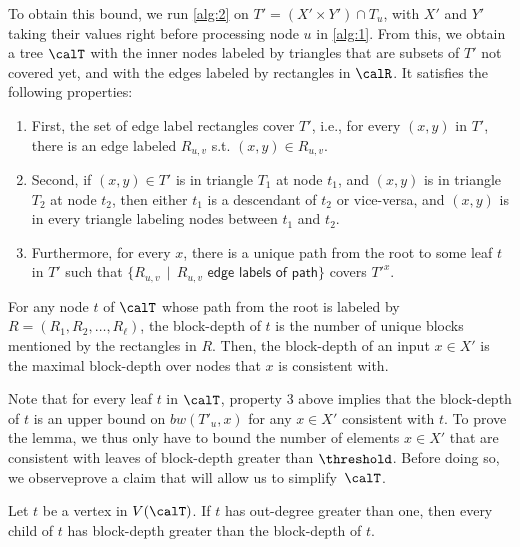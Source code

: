     To obtain this bound, we run \autoref{alg:2} on $T' = (X'\times Y')\cap T_u$, with $X'$ and $Y'$ taking their values right before processing node $u$ in \autoref{alg:1}. From this, we obtain a tree $\calT$ with the inner nodes labeled by triangles that are subsets of $T'$ not covered yet, and with the edges labeled by rectangles in $\calR$. It satisfies the following properties: 
    \begin{enumerate}
        \item First, the set of edge label rectangles cover $T'$, i.e., for every $(x,y)$ in $T'$, there is an edge labeled $R_{u,v}$ s.t. $(x,y) \in R_{u,v}$. \item Second, if $(x,y) \in T'$ is in triangle $T_1$ at node $t_1$, and $(x,y)$ is in triangle $T_2$ at node $t_2$, then either $t_1$ is a descendant of $t_2$ or vice-versa, and $(x,y)$ is in every triangle labeling nodes between $t_1$ and $t_2$. \item Furthermore, for every $x$, there is a unique path from the root to some leaf $t$ in $T'$ such that $\{R_{u,v}\,\mid \, R_{u,v}\textsf{ edge labels of path}\}$ covers $T'^x$. 
    \end{enumerate}
    

    For any node $t$ of $\calT$ whose path from the root is labeled by $R = (R_1,R_2,\dots,R_\ell)$, the block-depth of $t$ is the number of unique blocks mentioned by the rectangles in $R$. Then, the block-depth of an input $x\in X'$ is the maximal block-depth over nodes that $x$ is consistent with.
    
    Note that for every leaf $t$ in $\calT$, property 3 above implies that the block-depth of $t$ is an upper bound on $bw(T'_u,x)$ for any $x\in X'$ consistent with $t$. To prove the lemma, we thus only have to bound the number of elements $x\in X'$ that are consistent with leaves of block-depth greater than $\threshold$. Before doing so, we 
{observe}{prove} a claim that will allow us to simplify~$\calT$.
    \begin{claim}
        Let $t$ be a vertex in $V(\calT)$. If $t$ has out-degree greater than one, then every child of $t$ has block-depth greater than the block-depth of $t$.
    \end{claim}

